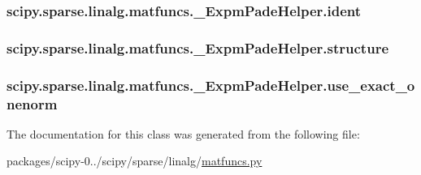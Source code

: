\subsubsection[{ident}]{\setlength{\rightskip}{0pt plus 5cm}scipy.\+sparse.\+linalg.\+matfuncs.\+\_\+\+Expm\+Pade\+Helper.\+ident}\label{classscipy_1_1sparse_1_1linalg_1_1matfuncs_1_1__ExpmPadeHelper_a37601cee3d4999d1101e36fe4feae0f8}
\hypertarget{classscipy_1_1sparse_1_1linalg_1_1matfuncs_1_1__ExpmPadeHelper_a1408150ff0735dfe671d5572e0869aff}{}
\subsubsection[{structure}]{\setlength{\rightskip}{0pt plus 5cm}scipy.\+sparse.\+linalg.\+matfuncs.\+\_\+\+Expm\+Pade\+Helper.\+structure}\label{classscipy_1_1sparse_1_1linalg_1_1matfuncs_1_1__ExpmPadeHelper_a1408150ff0735dfe671d5572e0869aff}
\hypertarget{classscipy_1_1sparse_1_1linalg_1_1matfuncs_1_1__ExpmPadeHelper_ae9e32e33dcfc7d5afdc8a3c8645c1641}{}
\subsubsection[{use\+\_\+exact\+\_\+onenorm}]{\setlength{\rightskip}{0pt plus 5cm}scipy.\+sparse.\+linalg.\+matfuncs.\+\_\+\+Expm\+Pade\+Helper.\+use\+\_\+exact\+\_\+onenorm}\label{classscipy_1_1sparse_1_1linalg_1_1matfuncs_1_1__ExpmPadeHelper_ae9e32e33dcfc7d5afdc8a3c8645c1641}


The documentation for this class was generated from the following file\+:\begin{DoxyCompactItemize}
\item 
packages/scipy-\/0../scipy/sparse/linalg/\hyperlink{sparse_2linalg_2matfuncs_8py}{matfuncs.\+py}\end{DoxyCompactItemize}
